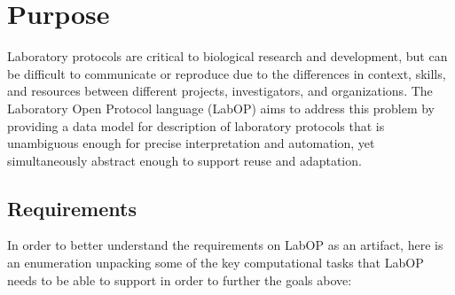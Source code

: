 \section{Purpose}

Laboratory protocols are critical to biological research and development, but can be difficult to communicate or reproduce due to the differences in context, skills, and resources between different projects, investigators, and organizations.
The Laboratory Open Protocol language (LabOP) aims to address this problem by providing a data model for description of laboratory protocols that is unambiguous enough for precise interpretation and automation, yet simultaneously abstract enough to support reuse and adaptation.

\subsection{Requirements}

In order to better understand the requirements on LabOP as an artifact, here is an enumeration unpacking some of the key computational tasks that LabOP needs to be able to support in order to further the goals above:

